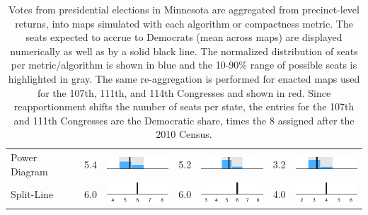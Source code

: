 \begin{table}
\begin{tabular}{l rm{7em} rm{7em} rm{7em}}
Power Diagram          &   5.4 &        \includegraphics[width=7em]{mini_hist/MN_2008_power} &   5.2 &        \includegraphics[width=7em]{mini_hist/MN_2012_power} &   3.2 &        \includegraphics[width=7em]{mini_hist/MN_2016_power} \\
Split-Line             &   6.0 &        \includegraphics[width=7em]{mini_hist/MN_2008_split_ax} &   6.0 &        \includegraphics[width=7em]{mini_hist/MN_2012_split_ax} &   4.0 &        \includegraphics[width=7em]{mini_hist/MN_2016_split_ax} \\
\hline \hline
\end{tabular}
\caption{Votes from presidential elections in Minnesota are aggregated from precinct-level returns, into maps simulated with each algorithm or compactness metric. 
             The seats expected to accrue to Democrats (mean across maps) are displayed numerically as well as by a solid black line.
             The normalized distribution of seats per metric/algorithm is shown in blue and the 10-90\% range of possible seats is highlighted in gray.
             The same re-aggregation is performed for enacted maps used for the 107th, 111th, and 114th Congresses and shown in red.
             Since reapportionment shifts the number of seats per state,
               the entries for the 107th and 111th Congresses are the Democratic share,
               times the 8 assigned after the 2010 Census.
             }\label{tab:MN_seats}
\end{table}
 